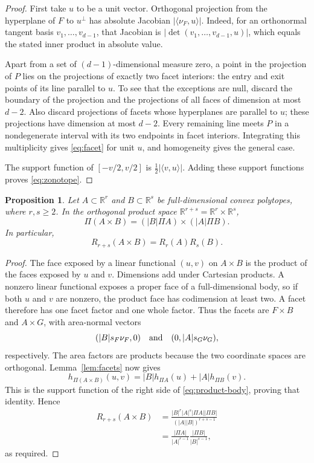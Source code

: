\documentclass[11pt]{article}
\newtheorem{proposition}[theorem]{Proposition}
\newcommand{\R}{\mathbb R}
\begin{document}
\begin{proof}
First take \(u\) to be a unit vector. Orthogonal projection from the
hyperplane of \(F\) to \(u^\perp\) has absolute Jacobian
\(|\langle\nu_F,u\rangle|\). Indeed, for an orthonormal tangent basis
\(v_1,\ldots,v_{d-1}\), that Jacobian is
\(|\det(v_1,\ldots,v_{d-1},u)|\), which equals the stated inner product
in absolute value.

Apart from a set of \((d-1)\)-dimensional measure zero, a point in the
projection of \(P\) lies on the projections of exactly two facet
interiors: the entry and exit points of its line parallel to \(u\).
To see that the exceptions are null, discard the boundary of the
projection and the projections of all faces of dimension at most
\(d-2\). Also discard projections of facets whose hyperplanes are parallel to
\(u\); these projections have dimension at most \(d-2\).
Every remaining line meets \(P\) in a nondegenerate interval with its
two endpoints in facet interiors. Integrating this multiplicity gives
\eqref{eq:facet} for unit \(u\), and homogeneity gives the general case.

The support function of \([-v/2,v/2]\) is
\(\tfrac12|\langle v,u\rangle|\). Adding these support functions proves
\eqref{eq:zonotope}.
\end{proof}

\begin{proposition}\label{prop:product}
Let \(A\subset\R^r\) and \(B\subset\R^s\) be full-dimensional convex
polytopes, where \(r,s\ge2\). In the orthogonal product space
\(\R^{r+s}=\R^r\times\R^s\),
\begin{equation}\label{eq:product-body}
 \Pi(A\times B)=(|B|\Pi A)\times(|A|\Pi B).
\end{equation}
In particular,
\begin{equation}\label{eq:multiplicative}
 R_{r+s}(A\times B)=R_r(A)R_s(B).
\end{equation}
\end{proposition}

\begin{proof}
The face exposed by a linear functional \((u,v)\) on \(A\times B\)
is the product of the faces exposed by \(u\) and \(v\).
Dimensions add under Cartesian products. A nonzero linear functional
exposes a proper face of a full-dimensional body, so if both \(u\) and
\(v\) are nonzero, the product face has codimension at least two.
A facet therefore has one facet factor and one whole factor.
Thus the facets are \(F\times B\)
and \(A\times G\), with area-normal vectors
\[
 (|B|s_F\nu_F,0)
 \quad\hbox{and}\quad
 (0,|A|s_G\nu_G),
\]
respectively. The area factors are products because the two coordinate
spaces are orthogonal. Lemma~\ref{lem:facets} now gives
\[
 h_{\Pi(A\times B)}(u,v)
 =|B|h_{\Pi A}(u)+|A|h_{\Pi B}(v).
\]
This is the support function of the right side of
\eqref{eq:product-body}, proving that identity. Hence
\[
 \begin{split}
 R_{r+s}(A\times B)
 &=\frac{|B|^r|A|^s|\Pi A||\Pi B|}
         {(|A||B|)^{r+s-1}}\\
 &=\frac{|\Pi A|}{|A|^{r-1}}
   \frac{|\Pi B|}{|B|^{s-1}},
 \end{split}
\]
as required.
\end{proof}
\end{document}
